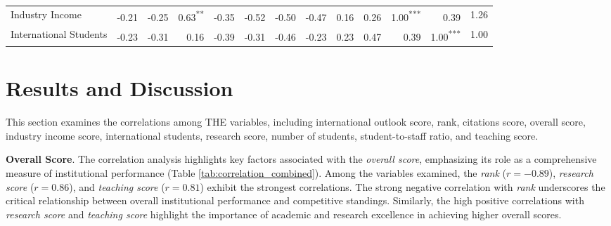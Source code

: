 \documentclass[conference]{IEEEtran}
\begin{document}
\begin{table*}[h!]
\begin{tabular}{|l|r|r|r|r|r|r|r|r|r|r|r|r|}
		Industry Income & \cellcolor{gray!10}-0.21\textsuperscript{} & \cellcolor{gray!12}-0.25\textsuperscript{} & \cellcolor{gray!31}0.63\textsuperscript{**} & \cellcolor{gray!17}-0.35\textsuperscript{} & \cellcolor{gray!26}-0.52\textsuperscript{} & \cellcolor{gray!25}-0.50\textsuperscript{} & \cellcolor{gray!23}-0.47\textsuperscript{} & \cellcolor{gray!8}0.16\textsuperscript{} & \cellcolor{gray!13}0.26\textsuperscript{} & \cellcolor{gray!50}1.00\textsuperscript{***} & \cellcolor{gray!19}0.39\textsuperscript{} & 1.26 \\
		
		International Students & \cellcolor{gray!11}-0.23\textsuperscript{} & \cellcolor{gray!15}-0.31\textsuperscript{} & \cellcolor{gray!8}0.16\textsuperscript{} & \cellcolor{gray!19}-0.39\textsuperscript{} & \cellcolor{gray!15}-0.31\textsuperscript{} & \cellcolor{gray!23}-0.46\textsuperscript{} & \cellcolor{gray!11}-0.23\textsuperscript{} & \cellcolor{gray!11}0.23\textsuperscript{} & \cellcolor{gray!23}0.47\textsuperscript{} & \cellcolor{gray!19}0.39\textsuperscript{} & \cellcolor{gray!50}1.00\textsuperscript{***} & 1.00 \\
		
		\hline
	\end{tabular}
\end{table*}




\section{Results and Discussion}
This section examines the correlations among THE variables, including international outlook score, rank, citations score, overall score, industry income score, international students, research score, number of students, student-to-staff ratio, and teaching score. 

\textbf{Overall Score}. The correlation analysis highlights key factors associated with the \textit{overall score}, emphasizing its role as a comprehensive measure of institutional performance (Table \ref{tab:correlation_combined}). Among the variables examined, the \textit{rank} ($r = -0.89$), \textit{research score} ($r = 0.86$), and \textit{teaching score} ($r = 0.81$) exhibit the strongest correlations. The strong negative correlation with \textit{rank} underscores the critical relationship between overall institutional performance and competitive standings. Similarly, the high positive correlations with \textit{research score} and \textit{teaching score} highlight the importance of academic and research excellence in achieving higher overall scores.
\end{document}
